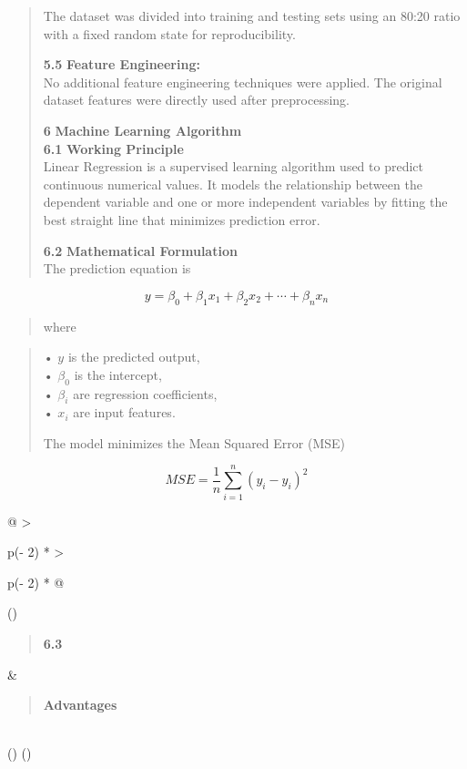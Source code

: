 \documentclass[
]{article}
\begin{document}
\begin{quote}
The dataset was divided into training and testing sets using an 80:20
ratio with a fixed random state for reproducibility.

\textbf{5.5} \textbf{Feature Engineering:}\\
No additional feature engineering techniques were applied. The original
dataset features were directly used after preprocessing.

\textbf{6} \textbf{Machine Learning Algorithm}\\
\textbf{6.1} \textbf{Working Principle}\\
Linear Regression is a supervised learning algorithm used to predict
continuous numerical values. It models the relationship between the
dependent variable and one or more independent variables by fitting the
best straight line that minimizes prediction error.

\textbf{6.2} \textbf{Mathematical Formulation}\\
The prediction equation is
\end{quote}

\[y = \beta_0 + \beta_1 x_1 + \beta_2 x_2 + \cdots + \beta_n x_n\]

\begin{quote}
where
\end{quote}

\begin{quote}
• $y$ is the predicted output,\\
• $\beta_0$ is the intercept,\\
• $\beta_i$ are regression coefficients,\\
• $x_i$ are input features.

The model minimizes the Mean Squared Error (MSE)
\end{quote}

\[MSE = \frac{1}{n}\sum_{i=1}^{n}(y_i - \hat{y}_i)^2\]

\begin{longtable}[]{@{}
  >{\raggedright\arraybackslash}p{(\columnwidth - 2\tabcolsep) * }
  >{\raggedright\arraybackslash}p{(\columnwidth - 2\tabcolsep) * }@{}}
\toprule()
\begin{minipage}[b]{\linewidth}\raggedright
\begin{quote}
\textbf{6.3}
\end{quote}
\end{minipage} & \begin{minipage}[b]{\linewidth}\raggedright
\begin{quote}
\textbf{Advantages}
\end{quote}
\end{minipage} \\
\midrule()
\endhead
\bottomrule()
\end{longtable}
\end{document}
